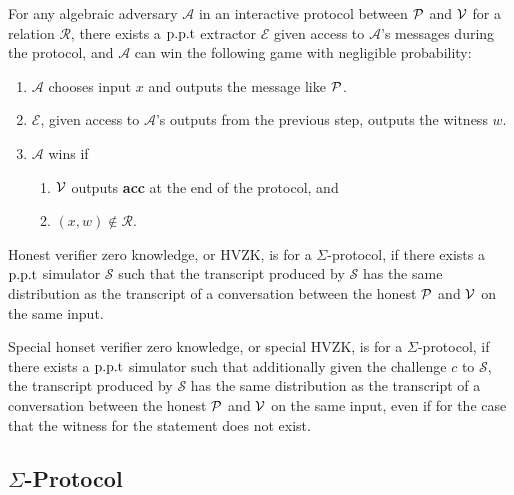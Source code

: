 \begin{definition}
For any algebraic adversary $\mathcal{A}$ in an interactive protocol between $\mathcal{P}$ and $\mathcal{V}$ for a relation $\mathcal{R}$, there exists a $\text{p.p.t}$ extractor $\mathcal{E}$ given access to $\mathcal{A}$'s messages during the protocol, and $\mathcal{A}$ can win the following game with negligible probability:
\begin{enumerate}
    \item $\mathcal{A}$ chooses input $x$ and outputs the message like $\mathcal{P}$.
    \item $\mathcal{E}$, given access to $\mathcal{A}$'s outputs from the previous step, outputs the witness $w$.
    \item $\mathcal{A}$ wins if
    \begin{enumerate}
        \item $\mathcal{V}$ outputs \textbf{acc} at the end of the protocol, and
        \item $(x,w)\notin\mathcal{R}$.
    \end{enumerate}
\end{enumerate}
\end{definition}

\begin{definition}
Honest verifier zero knowledge, or HVZK, is for a $\Sigma$-protocol, if there exists a $\text{p.p.t}$ simulator $\mathcal{S}$ such that the transcript produced by $\mathcal{S}$ has the same distribution as the transcript of a conversation between the honest $\mathcal{P}$ and $\mathcal{V}$ on the same input.
\end{definition}

\begin{definition}
Special honset verifier zero knowledge, or special HVZK, is for a $\Sigma$-protocol, if there exists a $\text{p.p.t}$ simulator such that additionally given the challenge $c$ to $\mathcal{S}$, the transcript produced by $\mathcal{S}$ has the same distribution as the transcript of a conversation between the honest $\mathcal{P}$ and $\mathcal{V}$ on the same input, even if for the case that the witness for the statement does not exist.
\end{definition}

\subsection{$\Sigma$-Protocol}

